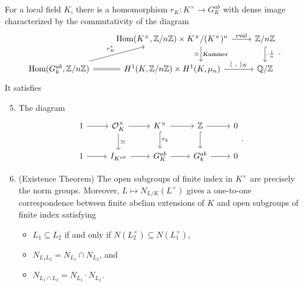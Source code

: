 \begin{theorem}
	For a local field $K$, there is a homomorphism $r_K:K^{\times}\to G_K^{ab}$ with dense image characterized by the commutativity of the diagram
	\[
	\begin{tikzcd}
		& \Hom(K^{\times},\ZZ/n\ZZ)\times K^{\times}/(K^{\times})^{n}\ar[d,shift left=3.5em,"\text{Kummer}","\simeq"']\ar{r}{\text{eval}} & \ZZ/n\ZZ\ar[hookrightarrow]{d}{\cdot\frac{1}{n}}\\
		\Hom(G_k^{ab},\ZZ/n\ZZ)\ar{ur}{r_K^{*}}\ar[equals]{r} & H^{1}(K,\ZZ/n\ZZ)\times H^{1}(K,\mu_n)\ar{r}{\langle\ ,\ \rangle_K} & \QQ/\ZZ 
	\end{tikzcd}
	.\] 
	It satisfies
	\begin{enumerate}[(1)]
		\setcounter{enumi}{4}
		\item The diagram
			\[
			\begin{tikzcd}
				1\ar[r]&\mathcal{O}_K^{\times}\ar[r]\ar[d,"\simeq"]&K^{\times}\ar[r]\ar[d,hookrightarrow,"r_k"]&\ZZ\ar[r]\ar[d,hookrightarrow]&0\\
				1\ar[r]&I_{K^{ab}}\ar[r]&G_K^{ab}\ar[r]&G_k^{ab}\ar[r]&0
			\end{tikzcd}
			.\] 
		\item (Existence Theorem) The open subgroups of finite index in $K^{\times}$ are precisely the norm groups. Moreover, $L\mapsto N_{L/K}(L^{\times})$ gives a one-to-one correspondence between finite abelian extensions of $K$ and open subgroups of finite index satisfying
			\begin{itemize}
				\item $L_1\subseteq L_2$ if and only if $N(L_2^{\times})\subseteq N(L_1^{\times})$,
				\item $N_{L_1L_2}=N_{L_1}\cap N_{L_2}$, and
				\item $N_{L_1\cap L_2}=N_{L_1}\cdot N_{L_2}$.
			\end{itemize}
	\end{enumerate}
\end{theorem}
